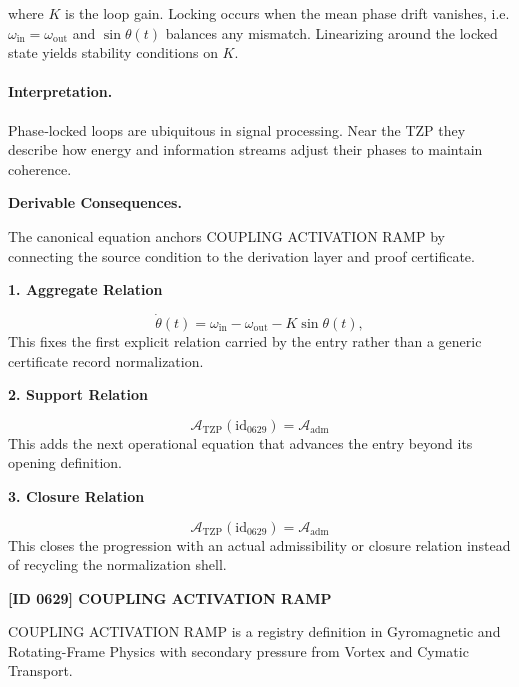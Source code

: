 where $K$ is the loop gain.  Locking occurs when the mean phase drift vanishes, i.e. $\omega_{\mathrm{in}} = \omega_{\mathrm{out}}$ and $\sin\theta(t)$ balances any mismatch.
Linearizing around the locked state yields stability conditions on $K$.

\paragraph{Interpretation.}

Phase‑locked loops are ubiquitous in signal processing.  Near the TZP they describe how energy and information streams adjust their phases to maintain coherence.

\par\vspace{0.35em}
\noindent\textbf{Derivable Consequences.}\quad
\begingroup
\footnotesize
\raggedright
The canonical equation anchors COUPLING ACTIVATION RAMP by connecting the source condition to the derivation layer and proof certificate.
\par\endgroup

\noindent\textbf{1. Aggregate Relation}\par
\[
\dot{\theta}(t) = \omega_{\mathrm{in}} - \omega_{\mathrm{out}} - K\sin\theta(t),
\]
\noindent This fixes the first explicit relation carried by the entry rather than a generic certificate record normalization.\par
\noindent\textbf{2. Support Relation}\par
\[
\mathcal{A}_{\mathrm{TZP}}(\mathrm{id}_{0629})=\mathcal{A}_{\mathrm{adm}}
\]
\noindent This adds the next operational equation that advances the entry beyond its opening definition.\par
\noindent\textbf{3. Closure Relation}\par
\[
\mathcal{A}_{\mathrm{TZP}}(\mathrm{id}_{0629})=\mathcal{A}_{\mathrm{adm}}
\]
\noindent This closes the progression with an actual admissibility or closure relation instead of recycling the normalization shell.\par

\clearpage
\noindent\textbf{[ID 0629] COUPLING ACTIVATION RAMP}\par
\vspace{0.35em}
\begingroup\small
{}
COUPLING ACTIVATION RAMP is a registry definition in Gyromagnetic and Rotating-Frame Physics with secondary pressure from Vortex and Cymatic Transport.

